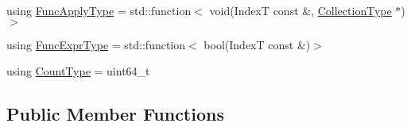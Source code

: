 \begin{DoxyCompactItemize}
\item 
using \hyperlink{structvt_1_1vrt_1_1collection_1_1_holder_a26e20d23447e935e218a07ffd638706d}{Func\+Apply\+Type} = std\+::function$<$ void(IndexT const  \&, \hyperlink{structvt_1_1vrt_1_1collection_1_1_holder_a38b4a4bfc4408cf28918c32433c80aac}{Collection\+Type} $\ast$)$>$
\item 
using \hyperlink{structvt_1_1vrt_1_1collection_1_1_holder_a5c28963c09fd935028444c5a09fada2d}{Func\+Expr\+Type} = std\+::function$<$ bool(IndexT const  \&)$>$
\item 
using \hyperlink{structvt_1_1vrt_1_1collection_1_1_holder_a3251a556ac19fc7dc4d0bd388cfaedeb}{Count\+Type} = uint64\+\_\+t
\end{DoxyCompactItemize}
\subsection*{Public Member Functions}
